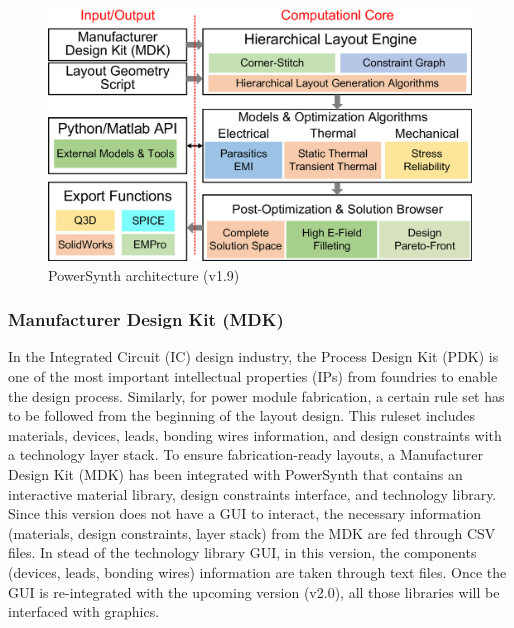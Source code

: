 \documentclass[11pt]{article}
\begin{document}
\begin{figure}[t]
\centering
\includegraphics[width=\linewidth]{figs/v_1.9_figs/PS_overview.eps}
\caption{ PowerSynth architecture (v1.9)}
\label{fig:architecture}
\end{figure}

\subsubsection{Manufacturer Design Kit (MDK)}
In the Integrated Circuit (IC) design industry, the Process Design Kit (PDK) is one of the most important intellectual properties (IPs) from foundries to enable the design process. Similarly, for power module fabrication, a certain rule set has to be followed from the beginning of the layout design. This ruleset includes materials, devices, leads, bonding wires information, and design constraints with a technology layer stack. To ensure fabrication-ready layouts, a Manufacturer Design Kit (MDK) has been integrated with PowerSynth that contains an interactive material library, design constraints interface, and technology library. Since this version does not have a GUI to interact, the necessary information (materials, design constraints, layer stack) from the MDK are fed through CSV files. In stead of the technology library GUI, in this version, the components (devices, leads, bonding wires) information are taken through text files. Once the GUI is re-integrated with the upcoming version (v2.0), all those libraries will be interfaced with graphics. 
\end{document}
